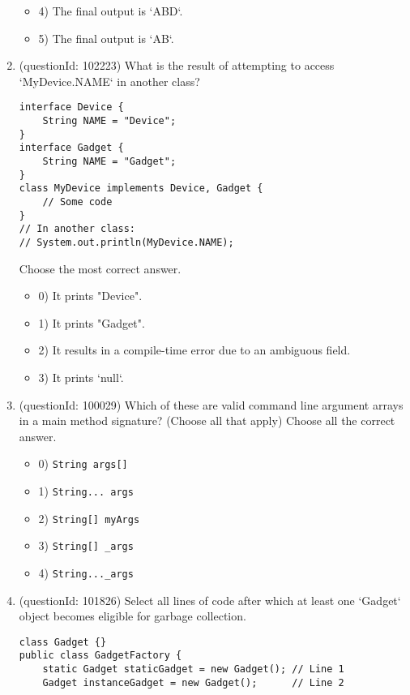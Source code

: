 \documentclass[12pt]{article}
\begin{document}
\begin{enumerate}[label=(\arabic*)]
\begin{itemize}
\item 4) The final output is `ABD`.

\item 5) The final output is `AB`.

\end{itemize}
\item (questionId: 102223) What is the result of attempting to access `MyDevice.NAME` in another class?\n\begin{verbatim}
interface Device {
    String NAME = "Device";
}
interface Gadget {
    String NAME = "Gadget";
}
class MyDevice implements Device, Gadget {
    // Some code
}
// In another class:
// System.out.println(MyDevice.NAME);
\end{verbatim}
Choose the most correct answer. 
\begin{itemize}
\item 0) It prints "Device".

\item 1) It prints "Gadget".

\item 2) It results in a compile-time error due to an ambiguous field.

\item 3) It prints `null`.

\end{itemize}
\item (questionId: 100029) Which of these are valid command line argument arrays in a main method signature? (Choose all that apply)
Choose all the correct answer.\begin{itemize}
\item 0) \verb|String args[]|

\item 1) \verb|String... args|

\item 2) \verb|String[] myArgs|

\item 3) \verb|String[] _args|

\item 4) \verb|String..._args|

\end{itemize}
\item (questionId: 101826) Select all lines of code after which at least one `Gadget` object becomes eligible for garbage collection.
\begin{verbatim}
class Gadget {}
public class GadgetFactory {
    static Gadget staticGadget = new Gadget(); // Line 1
    Gadget instanceGadget = new Gadget();      // Line 2


\end{verbatim}
\end{enumerate}
\end{document}
